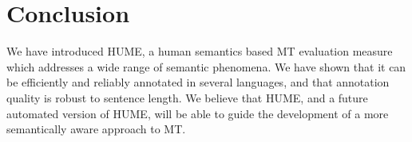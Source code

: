 \documentclass[11pt,letterpaper]{article}
\begin{document}
  
% 
% 
% 
% 
% 










\section{Conclusion}\label{sec:conclusion}

We have introduced HUME, a human semantics based MT evaluation measure which addresses
a wide range of semantic phenomena. We have shown that it can be efficiently and 
reliably annotated in 
several languages, and that annotation quality is robust to sentence length.
We believe that HUME, and a future automated version of HUME, will be able to guide the
development of a more semantically aware approach to MT.
\end{document}

